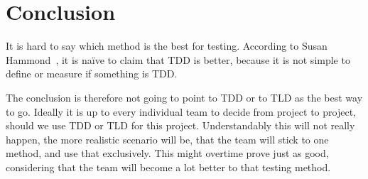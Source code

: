 \section{Conclusion}
\label{section:conclusion}
It is hard to say which method is the best for testing. According to Susan Hammond~\cite{sh2019}, it is naïve to claim that TDD is better, because it is not simple to define or measure if something is TDD.

The conclusion is therefore not going to point to TDD or to TLD as the best way to go. Ideally it is up to every individual team to decide from project to project, should we use TDD or TLD for this project. Understandably this will not really happen, the more realistic scenario will be, that the team will stick to one method, and use that exclusively. This might overtime prove just as good, considering that the team will become a lot better to that testing method.
